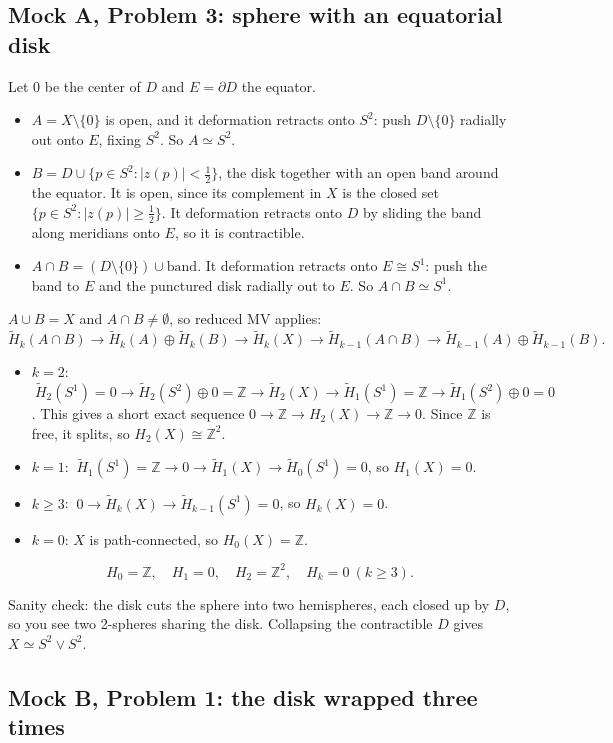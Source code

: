 \documentclass[11pt]{article}
\newcommand{\Z}{\mathbb Z}
\newcommand{\Hred}{\tilde H}
\begin{document}
\subsection*{Mock A, Problem 3: sphere with an equatorial disk}

Let $0$ be the center of $D$ and $E=\partial D$ the equator.
\begin{itemize}
\item $A=X\setminus\{0\}$ is open, and it deformation retracts onto $S^2$: push $D\setminus\{0\}$ radially out onto $E$, fixing $S^2$. So $A\simeq S^2$.
\item $B=D\cup\{p\in S^2:|z(p)|<\tfrac12\}$, the disk together with an open band around the equator. It is open, since its complement in $X$ is the closed set $\{p\in S^2:|z(p)|\ge\tfrac12\}$. It deformation retracts onto $D$ by sliding the band along meridians onto $E$, so it is contractible.
\item $A\cap B=(D\setminus\{0\})\cup\text{band}$. It deformation retracts onto $E\cong S^1$: push the band to $E$ and the punctured disk radially out to $E$. So $A\cap B\simeq S^1$.
\end{itemize}
$A\cup B=X$ and $A\cap B\neq\emptyset$, so reduced MV applies:
\[\Hred_k(A\cap B)\to\Hred_k(A)\oplus\Hred_k(B)\to\Hred_k(X)\to\Hred_{k-1}(A\cap B)\to\Hred_{k-1}(A)\oplus\Hred_{k-1}(B).\]
\begin{itemize}
\item $k=2$: $\ \Hred_2(S^1)=0\to\Hred_2(S^2)\oplus0=\Z\to\Hred_2(X)\to\Hred_1(S^1)=\Z\to\Hred_1(S^2)\oplus0=0$. This gives a short exact sequence $0\to\Z\to H_2(X)\to\Z\to0$. Since $\Z$ is free, it splits, so $H_2(X)\cong\Z^2$.
\item $k=1$: $\ \Hred_1(S^1)=\Z\to0\to\Hred_1(X)\to\Hred_0(S^1)=0$, so $H_1(X)=0$.
\item $k\ge3$: $\ 0\to\Hred_k(X)\to\Hred_{k-1}(S^1)=0$, so $H_k(X)=0$.
\item $k=0$: $X$ is path-connected, so $H_0(X)=\Z$.
\end{itemize}
\[\boxed{H_0=\Z,\quad H_1=0,\quad H_2=\Z^2,\quad H_k=0\ (k\ge3).}\]
\begin{note}
Sanity check: the disk cuts the sphere into two hemispheres, each closed up by $D$, so you see two 2-spheres sharing the disk. Collapsing the contractible $D$ gives $X\simeq S^2\vee S^2$.
\end{note}

\subsection*{Mock B, Problem 1: the disk wrapped three times}
\end{document}
